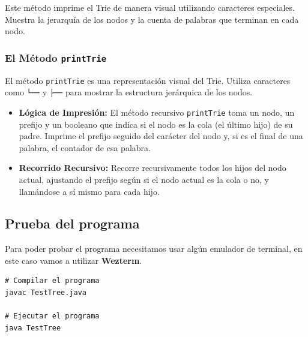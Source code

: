 \documentclass[11pt, a4paper]{article}
\begin{document}
Este método imprime el Trie de manera visual utilizando caracteres especiales. Muestra la jerarquía de los nodos y la cuenta de palabras que terminan en cada nodo.

\subsubsection{El Método \texttt{printTrie}}
El método \texttt{printTrie} es una representación visual del Trie. Utiliza caracteres como \texttt{└──} y \texttt{├──} para mostrar la estructura jerárquica de los nodos. 

\begin{itemize}
  \item \textbf{Lógica de Impresión:} El método recursivo \texttt{printTrie} toma un nodo, un prefijo y un booleano que indica si el nodo es la cola (el último hijo) de su padre. Imprime el prefijo seguido del carácter del nodo y, si es el final de una palabra, el contador de esa palabra.
  \item \textbf{Recorrido Recursivo:} Recorre recursivamente todos los hijos del nodo actual, ajustando el prefijo según si el nodo actual es la cola o no, y llamándose a sí mismo para cada hijo.
\end{itemize}

\subsection{Prueba del programa}
Para poder probar el programa necesitamos usar algún emulador de terminal, en este caso vamos a utilizar \textbf{Wezterm}.

\begin{verbatim}
# Compilar el programa
javac TestTree.java

# Ejecutar el programa
java TestTree
\end{verbatim}
\end{document}
